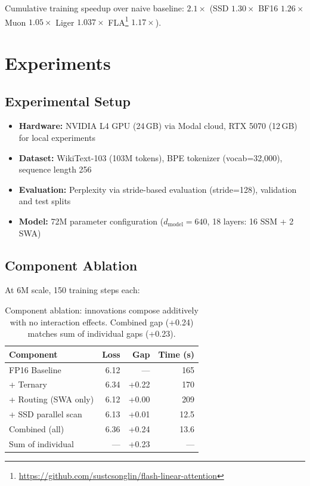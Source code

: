 \documentclass{article}
\begin{document}
Cumulative training speedup over naive baseline: $2.1\times$ (SSD $1.30\times$ BF16 $1.26\times$ Muon $1.05\times$ Liger $1.037\times$ FLA\footnote{\url{https://github.com/sustcsonglin/flash-linear-attention}} $1.17\times$).

\section{Experiments}

\subsection{Experimental Setup}

\begin{itemize}
    \item \textbf{Hardware:} NVIDIA L4 GPU (24\,GB) via Modal cloud, RTX 5070 (12\,GB) for local experiments
    \item \textbf{Dataset:} WikiText-103 \citep{merity2017pointer} (103M tokens), BPE tokenizer (vocab=32,000), sequence length 256
    \item \textbf{Evaluation:} Perplexity via stride-based evaluation (stride=128), validation and test splits
    \item \textbf{Model:} 72M parameter configuration ($d_\text{model}=640$, 18 layers: 16 SSM + 2 SWA)
\end{itemize}

\subsection{Component Ablation}

At 6M scale, 150 training steps each:

\begin{table}[t]
\centering
\small
\caption{Component ablation: innovations compose additively with no interaction effects. Combined gap (+0.24) matches sum of individual gaps (+0.23).}
\label{tab:component_ablation}
\begin{tabular}{lrrr}
\toprule
\textbf{Component} & \textbf{Loss} & \textbf{Gap} & \textbf{Time (s)} \\
\midrule
FP16 Baseline & 6.12 & --- & 165 \\
+ Ternary & 6.34 & +0.22 & 170 \\
+ Routing (SWA only) & 6.12 & +0.00 & 209 \\
+ SSD parallel scan & 6.13 & +0.01 & 12.5 \\
\midrule
Combined (all) & 6.36 & +0.24 & 13.6 \\
Sum of individual & --- & +0.23 & --- \\
\bottomrule
\end{tabular}
\end{table}
\end{document}
